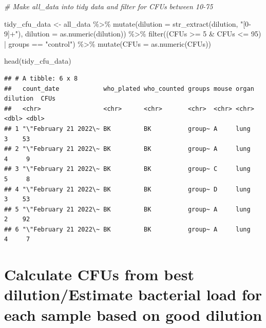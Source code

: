 \documentclass[
]{book}
\newenvironment{Shaded}{\begin{snugshade}}{\end{snugshade}}
\newcommand{\AttributeTok}[1]{\textcolor[rgb]{0.77,0.63,0.00}{#1}}
\newcommand{\CommentTok}[1]{\textcolor[rgb]{0.56,0.35,0.01}{\textit{#1}}}
\newcommand{\DecValTok}[1]{\textcolor[rgb]{0.00,0.00,0.81}{#1}}
\newcommand{\FunctionTok}[1]{\textcolor[rgb]{0.00,0.00,0.00}{#1}}
\newcommand{\NormalTok}[1]{#1}
\newcommand{\OtherTok}[1]{\textcolor[rgb]{0.56,0.35,0.01}{#1}}
\newcommand{\SpecialCharTok}[1]{\textcolor[rgb]{0.00,0.00,0.00}{#1}}
\newcommand{\StringTok}[1]{\textcolor[rgb]{0.31,0.60,0.02}{#1}}
\begin{document}
\begin{Shaded}
\begin{Highlighting}[]
\CommentTok{\# Make all\_data into tidy data and filter for CFUs between 10{-}75}
  
\NormalTok{tidy\_cfu\_data }\OtherTok{\textless{}{-}}\NormalTok{ all\_data }\SpecialCharTok{\%\textgreater{}\%}
  \FunctionTok{mutate}\NormalTok{(}\AttributeTok{dilution =} \FunctionTok{str\_extract}\NormalTok{(dilution, }\StringTok{"[0{-}9]+"}\NormalTok{),}
         \AttributeTok{dilution =} \FunctionTok{as.numeric}\NormalTok{(dilution)) }\SpecialCharTok{\%\textgreater{}\%}
  \FunctionTok{filter}\NormalTok{((CFUs }\SpecialCharTok{\textgreater{}=} \DecValTok{5} \SpecialCharTok{\&}\NormalTok{ CFUs }\SpecialCharTok{\textless{}=} \DecValTok{95}\NormalTok{) }\SpecialCharTok{|}\NormalTok{ groups }\SpecialCharTok{==} \StringTok{"control"}\NormalTok{) }\SpecialCharTok{\%\textgreater{}\%}
  \FunctionTok{mutate}\NormalTok{(}\AttributeTok{CFUs =} \FunctionTok{as.numeric}\NormalTok{(CFUs)) }


\FunctionTok{head}\NormalTok{(tidy\_cfu\_data)}
\end{Highlighting}
\end{Shaded}

\begin{verbatim}
## # A tibble: 6 x 8
##   count_date            who_plated who_counted groups mouse organ dilution  CFUs
##   <chr>                 <chr>      <chr>       <chr>  <chr> <chr>    <dbl> <dbl>
## 1 "\"February 21 2022\~ BK         BK          group~ A     lung         3    53
## 2 "\"February 21 2022\~ BK         BK          group~ A     lung         4     9
## 3 "\"February 21 2022\~ BK         BK          group~ C     lung         5     8
## 4 "\"February 21 2022\~ BK         BK          group~ D     lung         3    53
## 5 "\"February 21 2022\~ BK         BK          group~ A     lung         2    92
## 6 "\"February 21 2022\~ BK         BK          group~ A     lung         4     7
\end{verbatim}

\hypertarget{calculate-cfus-from-best-dilutionestimate-bacterial-load-for-each-sample-based-on-good-dilution}{%
\section{Calculate CFUs from best dilution/Estimate bacterial load for each sample based on good dilution}\label{calculate-cfus-from-best-dilutionestimate-bacterial-load-for-each-sample-based-on-good-dilution}}
\end{document}
